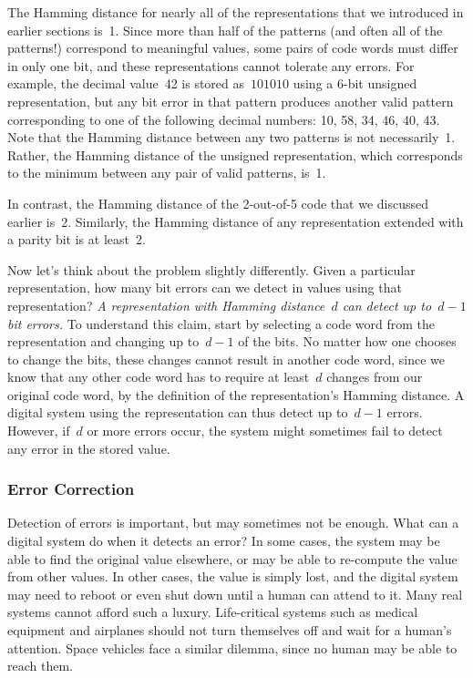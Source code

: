 The Hamming distance for nearly all of the representations that we 
introduced in earlier sections is~1.  Since more than half of the
patterns (and often all of the patterns!) correspond to meaningful
values, some pairs of code words must differ in only one bit, and
these representations cannot tolerate any errors.  For example,
the decimal value~42 is stored as~$101010$ using a \mbox{6-bit} unsigned
representation, but any bit error in that pattern produces another 
valid pattern corresponding to one of the following 
decimal numbers: 10, 58, 34, 46, 40, 43.  Note that the Hamming distance
between any two patterns is not necessarily~1.  Rather, the Hamming 
distance of the unsigned representation, which corresponds to the 
minimum between any pair of valid patterns, is~1.

In contrast, the Hamming distance of the \mbox{2-out-of-5} code that
we discussed earlier is~2.  Similarly, the Hamming distance of any
representation extended with a parity bit is at least~2.

Now let's think about the problem slightly differently.
%
Given a particular representation, 
%
how many bit errors can we detect in values using that representation?
%
{\it A representation with Hamming distance~$d$ can detect up to~$d-1$ bit errors.}
%
To understand this claim, start by selecting a code word from the
representation and changing up to~$d-1$ of the bits.  No matter
how one chooses to change the bits, these changes cannot result in
another code word, since we know that any other code word has to 
require at least~$d$ changes from our original code word, by the
definition of the representation's Hamming distance.
%
A digital system using the representation can thus detect up to~$d-1$
errors.  However, if~$d$ or more errors occur, the system might sometimes
fail to detect any error in the stored value.\\


\subsubsection{Error Correction}

Detection of errors is important, but may sometimes not be enough.
What can a digital system do when it detects an error?  In some
cases, the system may be able to find the original value elsewhere, or
may be able to re-compute the value from other values.  In other 
cases, the value is simply lost, and the digital system may need
to reboot or even shut down until a human can attend to it.
%
Many real systems cannot afford such a luxury.  Life-critical systems
such as medical equipment and airplanes should not turn themselves off
and wait for a human's attention.  Space vehicles face a similar dilemma,
since no human may be able to reach them.

